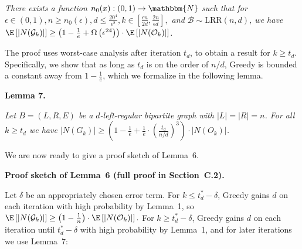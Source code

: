 \documentclass[10pt,a4paper]{article}
\begin{document}
\emph{There exists a function $n_{0}(x):(0,1)\rightarrow\mathbbm{N}$ such that for $\epsilon\in(0,1),n\geq n_{0}(\epsilon),d\leq\frac{20^{4}}{\epsilon^{8}},k\in\left[\frac{\epsilon n}{2d},\frac{2n}{\epsilon d}\right],$ and $\mathcal{B}\sim\text{{LRR}}(n,d)$, we have $\E\left[|N(\mathcal{G}_{k})|\right]\geq\left(1-\frac{1}{e}+\Omega\left(\epsilon^{24}\right)\right)\cdot\E\left[|N(\mathcal{O}_{k})|\right]$.}\par






The proof uses worst-case analysis after iteration $t_{d}$, to obtain a result for $k\geq t_{d}$.
Specifically, we show that as long as $t_{d}$ is on the order of $n/d$, Greedy is bounded a constant away from $1-\frac{1}{e}$, which we formalize in the following lemma.\par





\par\medskip\noindent\textbf{\textbf{Lemma 7}\textbf{.}}\par



\emph{Let $B=(L,R,E)$ be a $d$-left-regular bipartite graph with $|L|=|R|=n$.
For all $k\geq t_{d}$ we have $|N(G_{k})|\geq\left(1-\frac{1}{e}+\frac{1}{e}\cdot\left(\frac{t_{d}}{n/d}\right)^{3}\right)\cdot|N(O_{k})|$.}\par






We are now ready to give a proof sketch of Lemma 6.\par




\par\medskip\noindent\textbf{Proof sketch of Lemma 6 (full proof in Section C.2).}\par



Let $\delta$ be an appropriately chosen error term. For $k\leq t^{*}_{d}-\delta$, Greedy gains $d$ on each iteration with high probability by Lemma 1, so
$\E\left[|N(\mathcal{G}_{k})|\right]\geq\left(1-\frac{1}{n}\right)\cdot\E\left[|N(\mathcal{O}_{k})|\right].$ For $k\geq t^{*}_{d}-\delta$, Greedy gains $d$ on each iteration until $t^{*}_{d}-\delta$ with high probability by Lemma 1, and for later iterations we use Lemma 7:\par
\end{document}
